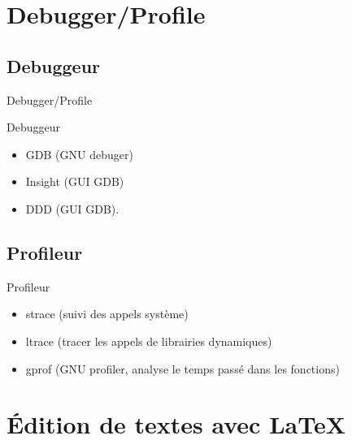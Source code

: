 \def\sectitle{Debugger/Profile}
\section{\sectitle}
\def\subsectitle{Debuggeur}
\subsection{\subsectitle}
\begin{frame}{\sectitle}
    \begin{block}{\subsectitle}
        \begin{itemize}
            \item GDB (GNU debuger)
            \item Insight (GUI GDB)
            \item DDD (GUI GDB).
        \end{itemize}
    \end{block}


\def\subsectitle{Profileur}
\subsection{\subsectitle}
    \begin{block}{\subsectitle}
        \begin{itemize}
            \item strace (suivi des appels système)
            \item ltrace (tracer les appels de librairies dynamiques)
            \item gprof (GNU profiler, analyse le temps passé dans les
                fonctions)
        \end{itemize}
    \end{block}

\end{frame}

\def\sectitle{Édition de textes avec \LaTeX}
\section{\sectitle}
\def\subsectitle{What you see is what you mean}
